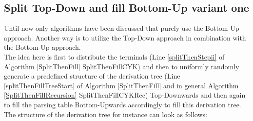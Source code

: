 \pagebreak
\subsection{Split Top-Down and fill Bottom-Up variant one}
Until now only algorithms have been discussed that purely use the Bottom-Up approach. Another way is to utilize the Top-Down approach in combination with the Bottom-Up approach.\\
The idea here is first to distribute the terminals (Line \ref{splitThenStepii} of Algorithm \ref{SplitThenFill} SplitThenFillCYK) and then to uniformly randomly generate a predefined structure of the derivation tree (Line \ref{splitThenFillTreeStart} of Algorithm \ref{SplitThenFill} and in general Algorithm \ref{SplitThenFillRecursion} SplitThenFillCYKRec) Top-Downwards and then again to fill the parsing table Bottom-Upwards accordingly to fill this derivation tree. The structure of the derivation tree for instance can look as follows:\\

